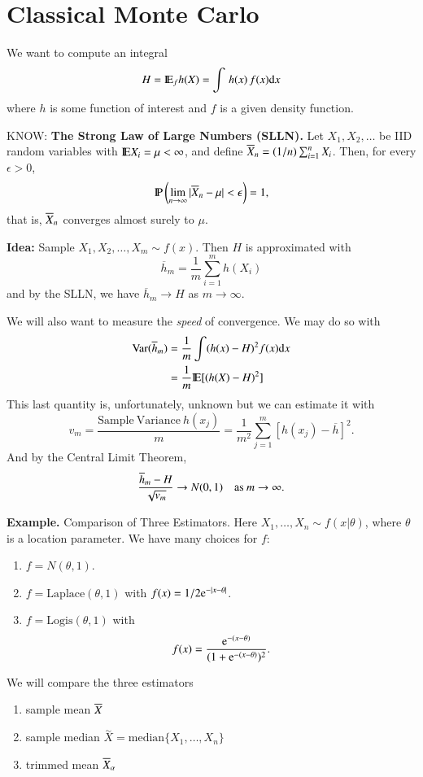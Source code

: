 \documentclass[captions=tableheading]{scrbook}
\begin{document}
\section{Classical Monte Carlo}
\label{sec-3_2}


We want to compute an integral 
\[
H=\mathrm{I\hspace{-1.5pt}E}_{f}h(X)=\int\, h(x)\, f(x)\mathrm{d} x
\]
where $h$ is some function of interest and $f$ is a given density function.

KNOW: \textbf{The Strong Law of Large Numbers (SLLN).} Let $X_{1},X_{2},\ldots$ be IID random variables with $\mathrm{I\hspace{-1.5pt}E} X_{i} = \mu < \infty$, and define $\overline{X}_{n}=(1/n)\sum_{i=1}^{n}X_{i}$. Then, for every $\epsilon>0$, 
\[
\mathrm{I\hspace{-1.5pt}P} \left(\lim_{n\to\infty} |\overline{X}_{n}-\mu| < \epsilon \right)=1,
\]
that is, $\overline{X}_{n}$ converges almost surely to $\mu$.

\textbf{Idea:} Sample \(X_{1},X_{2},\ldots,X_{m}\sim f(x)\). Then $H$ is approximated with 
\[
\overline{h}_{m}=\frac{1}{m}\sum_{i=1}^{m}h(X_{i})
\]
and by the SLLN, we have $\overline{h}_{m}\to H$ as $m\to\infty$.

We will also want to measure the \emph{speed} of convergence. We may do so with 
\begin{align*}
\mathrm{Var}(\overline{h}_{m}) & =\frac{1}{m}\int(h(x)-H)^{2}f(x)\mathrm{d} x\\
 & =\frac{1}{m}\mathrm{I\hspace{-1.5pt}E}[(h(X)-H)^{2}]
\end{align*}
This last quantity is, unfortunately, unknown but we can estimate it with 
\[
v_{m}=\frac{\mathrm{Sample\ Variance}\ h(x_{j})}{m}=\frac{1}{m^{2}}\sum_{j=1}^{m}[h(x_{j})-\overline{h}]^{2}.
\]
And by the Central Limit Theorem, 
\[
\frac{\overline{h}_{m}-H}{\sqrt{v_{m}}}\to N(0,1)\quad\mbox{as \ensuremath{m\to\infty}}.
\]


\textbf{Example.} Comparison of Three Estimators. Here $X_{1},\ldots,X_{n}\sim f(x|\theta)$, where $\theta$ is a location parameter. We have many choices for $f$:

\begin{enumerate}
\item $f = N(\theta,1)$.
\item $f = \mathrm{Laplace}(\theta,1)$ with $f(x)=1/2 \mathrm{e}^{-|x-\theta|}$.
\item $f = \mathrm{Logis}(\theta,1)$ with 
   \[
   f(x)=\frac{\mathrm{e}^{-(x-\theta)}}{(1 + \mathrm{e}^{-(x - \theta)})^{2}}.
   \]
\end{enumerate}

We will compare the three estimators

\begin{enumerate}
\item sample mean $\overline{X}$
\item sample median $\overset{\sim}{X}=\mbox{median}\{X_{1},\ldots,X_{n}\}$
\item trimmed mean $\overline{X}_{\alpha}$
\end{enumerate}
\end{document}
